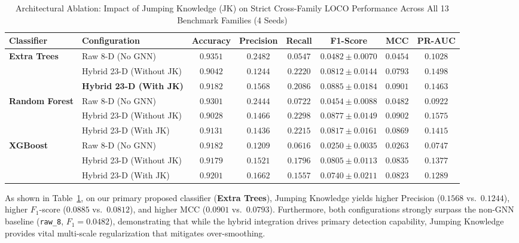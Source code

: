 \documentclass[11pt,a4paper]{article}
\begin{document}
\begin{enumerate}[leftmargin=*]
\begin{table}[htbp]
\centering
\small
\caption{Architectural Ablation: Impact of Jumping Knowledge (JK) on Strict Cross-Family LOCO Performance Across All 13 Benchmark Families (4 Seeds)}
\label{tab:ablation_jk}
\vspace{4pt}
\begin{tabular}{llcccccc}
\toprule
\textbf{Classifier} & \textbf{Configuration} & \textbf{Accuracy} & \textbf{Precision} & \textbf{Recall} & \textbf{F1-Score} & \textbf{MCC} & \textbf{PR-AUC} \\
\midrule
\multirow{3}{*}{\textbf{Extra Trees}} 
& Raw 8-D (No GNN)               & $0.9351$ & $0.2482$ & $0.0547$ & $0.0482 \pm 0.0070$ & $0.0454$ & $0.1028$ \\
& Hybrid 23-D (Without JK)       & $0.9042$ & $0.1244$ & $\mathbf{0.2220}$ & $0.0812 \pm 0.0144$ & $0.0793$ & $\mathbf{0.1498}$ \\
& \textbf{Hybrid 23-D (With JK)} & $\mathbf{0.9182}$ & $\mathbf{0.1568}$ & $0.2086$ & $\mathbf{0.0885 \pm 0.0184}$ & $\mathbf{0.0901}$ & $0.1463$ \\
\midrule
\multirow{3}{*}{\textbf{Random Forest}} 
& Raw 8-D (No GNN)               & $0.9301$ & $0.2444$ & $0.0722$ & $0.0454 \pm 0.0088$ & $0.0482$ & $0.0922$ \\
& Hybrid 23-D (Without JK)       & $0.9028$ & $\mathbf{0.1466}$ & $\mathbf{0.2298}$ & $\mathbf{0.0877 \pm 0.0149}$ & $\mathbf{0.0902}$ & $\mathbf{0.1575}$ \\
& Hybrid 23-D (With JK)          & $\mathbf{0.9131}$ & $0.1436$ & $0.2215$ & $0.0817 \pm 0.0161$ & $0.0869$ & $0.1415$ \\
\midrule
\multirow{3}{*}{\textbf{XGBoost}} 
& Raw 8-D (No GNN)               & $0.9182$ & $0.1209$ & $0.0616$ & $0.0250 \pm 0.0035$ & $0.0263$ & $0.0747$ \\
& Hybrid 23-D (Without JK)       & $0.9179$ & $0.1521$ & $\mathbf{0.1796}$ & $\mathbf{0.0805 \pm 0.0113}$ & $\mathbf{0.0835}$ & $\mathbf{0.1377}$ \\
& Hybrid 23-D (With JK)          & $\mathbf{0.9201}$ & $\mathbf{0.1662}$ & $0.1557$ & $0.0740 \pm 0.0211$ & $0.0823$ & $0.1289$ \\
\bottomrule
\end{tabular}
\end{table}

    As shown in Table~\ref{tab:ablation_jk}, on our primary proposed classifier (\textbf{Extra Trees}), Jumping Knowledge yields higher Precision ($0.1568$ vs.\ $0.1244$), higher $F_1$-score ($0.0885$ vs.\ $0.0812$), and higher MCC ($0.0901$ vs.\ $0.0793$). Furthermore, both configurations strongly surpass the non-GNN baseline (\texttt{raw\_8}, $F_1 = 0.0482$), demonstrating that while the hybrid integration drives primary detection capability, Jumping Knowledge provides vital multi-scale regularization that mitigates over-smoothing.


\end{enumerate}
\end{document}
